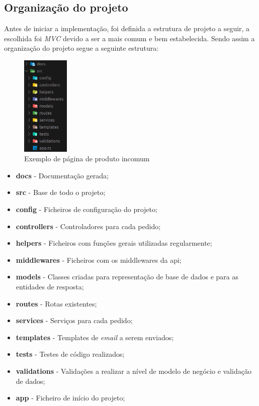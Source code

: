 \subsection{Organização do projeto}
Antes de iniciar a implementação, foi definida a estrutura de projeto a seguir, a escolhida foi \textit{MVC} devido a ser a mais comum e bem estabelecida. Sendo assim a organização do projeto segue a seguinte estrutura:
\begin{figure}[htb]
  \centering
  \includegraphics[width=0.2\textwidth]{images/implementacao/api/project_organization.png}
  \caption{Exemplo de página de produto incomum}
  \label{fig:63}
\end{figure}

\begin{itemize}
  \item \textbf{docs} - Documentação gerada;
  \item \textbf{src} - Base de todo o projeto;
  \item \textbf{config} - Ficheiros de configuração do projeto;
  \item \textbf{controllers} - Controladores para cada pedido;
  \item \textbf{helpers} - Ficheiros com funções gerais utilizadas regularmente;
  \item \textbf{middlewares} - Ficheiros com os middlewares da api;
  \item \textbf{models} - Classes criadas para representação de base de dados e para as entidades de resposta;
  \item \textbf{routes} - Rotas existentes;
  \item \textbf{services} - Serviços para cada pedido;
  \item \textbf{templates} - Templates de \textit{email} a serem enviados;
  \item \textbf{tests} - Testes de código realizados;
  \item \textbf{validations} - Validações a realizar a nível de modelo de negócio e validação de dados;
  \item \textbf{app} - Ficheiro de início do projeto;
\end{itemize}